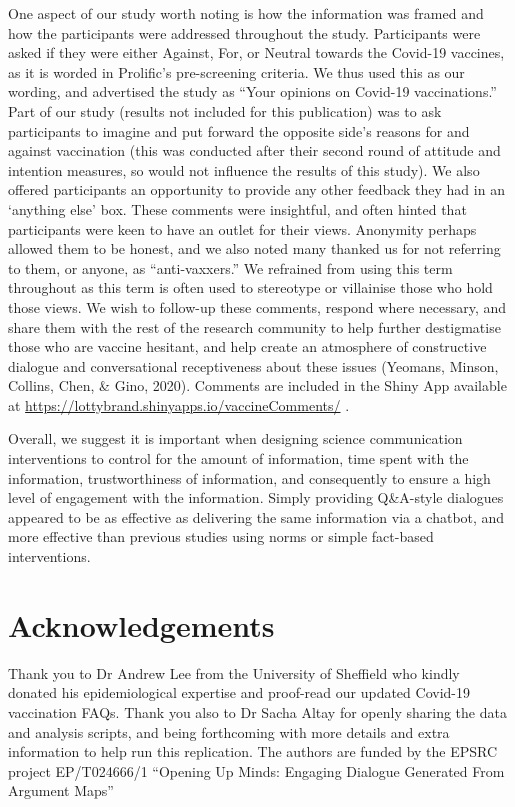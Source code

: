 \documentclass[
  english,
  ,jou,floatsintext]{apa6}
\begin{document}
One aspect of our study worth noting is how the information was framed and how the participants were addressed throughout the study. Participants were asked if they were either Against, For, or Neutral towards the Covid-19 vaccines, as it is worded in Prolific's pre-screening criteria. We thus used this as our wording, and advertised the study as ``Your opinions on Covid-19 vaccinations.'' Part of our study (results not included for this publication) was to ask participants to imagine and put forward the opposite side's reasons for and against vaccination (this was conducted after their second round of attitude and intention measures, so would not influence the results of this study). We also offered participants an opportunity to provide any other feedback they had in an `anything else' box. These comments were insightful, and often hinted that participants were keen to have an outlet for their views. Anonymity perhaps allowed them to be honest, and we also noted many thanked us for not referring to them, or anyone, as ``anti-vaxxers.'' We refrained from using this term throughout as this term is often used to stereotype or villainise those who hold those views. We wish to follow-up these comments, respond where necessary, and share them with the rest of the research community to help further destigmatise those who are vaccine hesitant, and help create an atmosphere of constructive dialogue and conversational receptiveness about these issues (Yeomans, Minson, Collins, Chen, \& Gino, 2020). Comments are included in the Shiny App available at \url{https://lottybrand.shinyapps.io/vaccineComments/} .

Overall, we suggest it is important when designing science communication interventions to control for the amount of information, time spent with the information, trustworthiness of information, and consequently to ensure a high level of engagement with the information. Simply providing Q\&A-style dialogues appeared to be as effective as delivering the same information via a chatbot, and more effective than previous studies using norms or simple fact-based interventions.

\hypertarget{acknowledgements}{%
\section{Acknowledgements}\label{acknowledgements}}

Thank you to Dr Andrew Lee from the University of Sheffield who kindly donated his epidemiological expertise and proof-read our updated Covid-19 vaccination FAQs.
Thank you also to Dr Sacha Altay for openly sharing the data and analysis scripts, and being forthcoming with more details and extra information to help run this replication. The authors are funded by the EPSRC project EP/T024666/1 ``Opening Up Minds: Engaging Dialogue Generated From Argument Maps''
\end{document}
